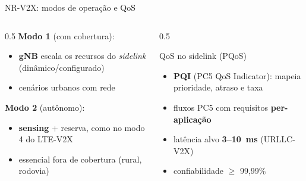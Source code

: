 \documentclass[aspectratio=169,11pt]{beamer}
\begin{document}
\begin{frame}{NR-V2X: modos de operação e QoS}
  \begin{columns}
    \begin{column}{0.5\textwidth}
      \textbf{Modo 1} (com cobertura):
      \begin{itemize}
        \item \textbf{gNB} escala os recursos do \emph{sidelink} (dinâmico/configurado)
        \item cenários urbanos com rede
      \end{itemize}
      \textbf{Modo 2} (autônomo):
      \begin{itemize}
        \item \textbf{sensing} + reserva, como no modo 4 do LTE-V2X
        \item essencial fora de cobertura (rural, rodovia)
      \end{itemize}
    \end{column}
    \begin{column}{0.5\textwidth}
      \begin{block}{QoS no sidelink (PQoS)}
        \begin{itemize}
          \item \textbf{PQI} (PC5 QoS Indicator): mapeia prioridade, atraso e taxa
          \item fluxos PC5 com requisitos \textbf{per-aplicação}
          \item latência alvo \textbf{3--10~ms} (URLLC-V2X)
          \item confiabilidade $\geq$ 99,99\%
        \end{itemize}
      \end{block}
    \end{column}
  \end{columns}
\end{frame}
\end{document}
